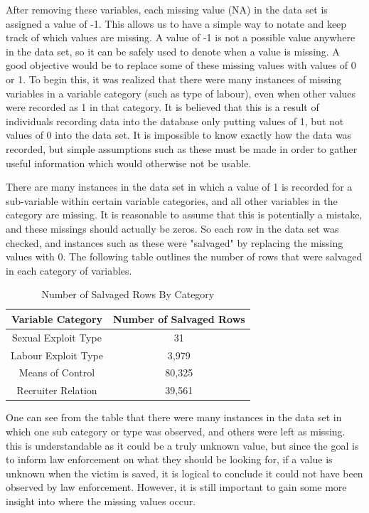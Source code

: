 \documentclass{article} %
\begin{document}
After removing these variables, each missing value (NA) in the data set is assigned a value of -1. This allows us to have a simple way to notate and keep track of which values are missing. A value of -1 is not a possible value anywhere in the data set, so it can be safely used to denote when a value is missing. A good objective would be to replace some of these missing values with values of 0 or 1. To begin this, it was realized that there were many instances of missing variables in a variable category (such as type of labour), even when other values were recorded as 1 in that category. It is believed that this is a result of individuals recording data into the database only putting values of 1, but not values of 0 into the data set. It is impossible to know exactly how the data was recorded, but simple assumptions such as these must be made in order to gather useful information which would otherwise not be usable.

There are many instances in the data set in which a value of 1 is recorded for a sub-variable within certain variable categories, and all other variables in the category are missing. It is reasonable to assume that this is potentially a mistake, and these missings should actually be zeros. So each row in the data set was checked, and instances such as these were "salvaged" by replacing the missing values with 0. The following table outlines the number of rows that were salvaged in each category of variables.

\FloatBarrier
\begin{table}[!ht]
	\centering
	\caption{Number of Salvaged Rows By Category}
	\label{tab:SalvageByCategory}
	\begin{tabular}{cc}
		\toprule
		 Variable Category  & Number of Salvaged Rows \\ \midrule
		Sexual Exploit Type &           31            \\
		Labour Exploit Type &          3,979          \\
		 Means of Control   &         80,325          \\
		Recruiter Relation  &         39,561          \\ \bottomrule
	\end{tabular}
\end{table}
\FloatBarrier
One can see from the table that there were many instances in the data set in which one sub category or type was observed, and others were left as missing. this is understandable as it could be a truly unknown value, but since the goal is to inform law enforcement on what they should be looking for, if a value is unknown when the victim is saved, it is logical to conclude it could not have been observed by law enforcement. However, it is still important to gain some more insight into where the missing values occur.
\end{document}
